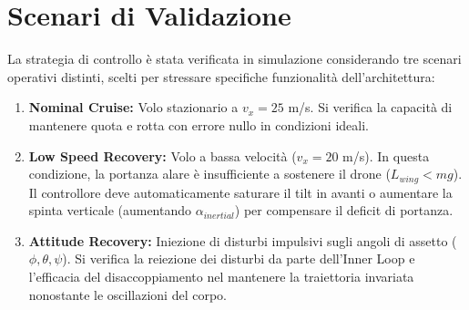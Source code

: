 
\section{Scenari di Validazione}
La strategia di controllo è stata verificata in simulazione considerando tre scenari operativi distinti, scelti per stressare specifiche funzionalità dell'architettura:
\begin{enumerate}
    \item \textbf{Nominal Cruise:} Volo stazionario a $v_x = 25$ m/s. Si verifica la capacità di mantenere quota e rotta con errore nullo in condizioni ideali.
    \item \textbf{Low Speed Recovery:} Volo a bassa velocità ($v_x = 20$ m/s). In questa condizione, la portanza alare è insufficiente a sostenere il drone ($L_{wing} < mg$). Il controllore deve automaticamente saturare il tilt in avanti o aumentare la spinta verticale (aumentando $\alpha_{inertial}$) per compensare il deficit di portanza.
    \item \textbf{Attitude Recovery:} Iniezione di disturbi impulsivi sugli angoli di assetto ($\phi, \theta, \psi$). Si verifica la reiezione dei disturbi da parte dell'Inner Loop e l'efficacia del disaccoppiamento nel mantenere la traiettoria invariata nonostante le oscillazioni del corpo.
\end{enumerate}